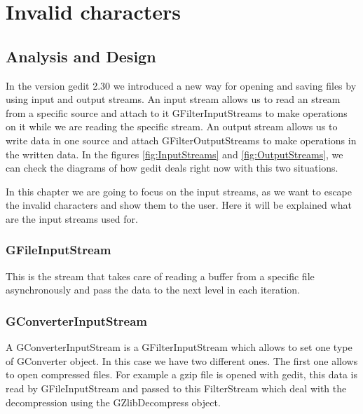 
\chapter{Invalid characters}

\section{Analysis and Design}

In the version gedit 2.30 we introduced a new way for opening and saving files by using input and output streams. An input stream allows us to read an stream from a specific source and attach to it GFilterInputStreams to make operations on it while we are reading the specific stream. An output stream allows us to write data in one source and attach GFilterOutputStreams to make operations in the written data. In the figures \ref{fig:InputStreams} and \ref{fig:OutputStreams}, we can check the diagrams of how gedit deals right now with this two situations.



In this chapter we are going to focus on the input streams, as we want to escape the invalid characters and show them to the user. Here it will be explained what are the input streams used for.

\subsection*{GFileInputStream}

This is the stream that takes care of reading a buffer from a specific file asynchronously and pass the data to the next level in each iteration.

\subsection*{GConverterInputStream}

A GConverterInputStream is a GFilterInputStream which allows to set one type of GConverter object. In this case we have two different ones. The first one allows to open compressed files. For example a gzip file is opened with gedit, this data is read by GFileInputStream and passed to this FilterStream which deal with the decompression using the GZlibDecompress object.


